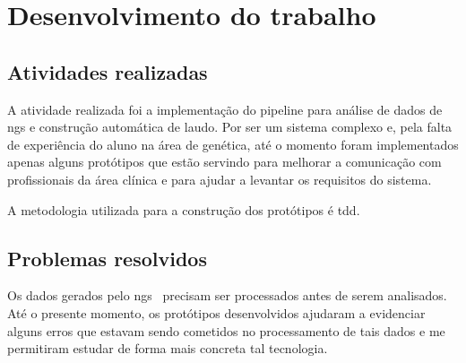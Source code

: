\chapter{Desenvolvimento do trabalho}
\label{chap:atividadesRealizadas}


\section{Atividades realizadas}

A atividade realizada foi a implementação do pipeline para análise de dados de \gls{ngs} e construção automática de laudo.
Por ser um sistema complexo e, pela falta de experiência do aluno na área de genética, até o momento foram implementados apenas
alguns protótipos que estão servindo para melhorar a comunicação com profissionais da área clínica e para ajudar a levantar os requisitos do
sistema.

A metodologia utilizada para a construção dos protótipos é \gls{tdd}.




%
%


\section{Problemas resolvidos}

Os dados gerados pelo \gls{ngs}~\cite{SamTools} precisam ser processados antes de serem analisados.
Até o presente momento, os protótipos desenvolvidos ajudaram a evidenciar alguns erros que estavam sendo cometidos
no processamento de tais dados e me permitiram estudar de forma mais concreta tal tecnologia.


